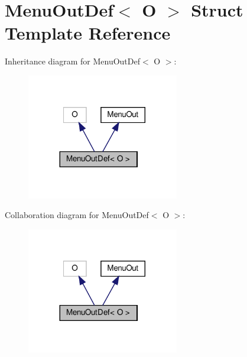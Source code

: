 \hypertarget{structMenuOutDef}{}\section{Menu\+Out\+Def$<$ O $>$ Struct Template Reference}
\label{structMenuOutDef}


Inheritance diagram for Menu\+Out\+Def$<$ O $>$\+:\nopagebreak
\begin{figure}[H]
\begin{center}
\leavevmode
\includegraphics[width=188pt]{structMenuOutDef__inherit__graph}
\end{center}
\end{figure}


Collaboration diagram for Menu\+Out\+Def$<$ O $>$\+:\nopagebreak
\begin{figure}[H]
\begin{center}
\leavevmode
\includegraphics[width=188pt]{structMenuOutDef__coll__graph}
\end{center}
\end{figure}
